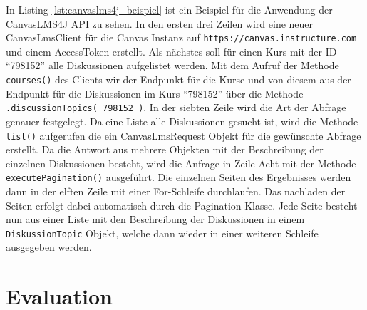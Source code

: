 In Listing \ref{lst:canvaslms4j_beispiel} ist ein Beispiel für die Anwendung der CanvasLMS4J API zu sehen. In den ersten drei Zeilen wird eine neuer CanvasLmsClient für die Canvas Instanz auf \texttt{https://canvas.instructure.com} und einem AccessToken erstellt. Als nächstes soll für einen Kurs mit der ID \enquote{798152} alle Diskussionen aufgelistet werden. Mit dem Aufruf der Methode \texttt{courses()} des Clients wir der Endpunkt für die Kurse und von diesem aus der Endpunkt für die Diskussionen im Kurs \enquote{798152} über die Methode \texttt{.discussionTopics( 798152 )}. In der siebten Zeile wird die Art der Abfrage genauer festgelegt. Da eine Liste alle Diskussionen gesucht ist, wird die Methode \texttt{list()} aufgerufen die ein CanvasLmsRequest Objekt für die gewünschte Abfrage erstellt. Da die Antwort aus mehrere Objekten mit der Beschreibung der einzelnen Diskussionen besteht, wird die Anfrage in Zeile Acht mit der Methode \texttt{executePagination()} ausgeführt. Die einzelnen Seiten des Ergebnisses werden dann in der elften Zeile mit einer For-Schleife durchlaufen. Das nachladen der Seiten erfolgt dabei automatisch durch die Pagination Klasse. Jede Seite besteht nun aus einer Liste mit den Beschreibung der Diskussionen in einem \texttt{DiskussionTopic} Objekt, welche dann wieder in einer weiteren Schleife ausgegeben werden.







\section{Evaluation} %
\label{sec:evaluation}


